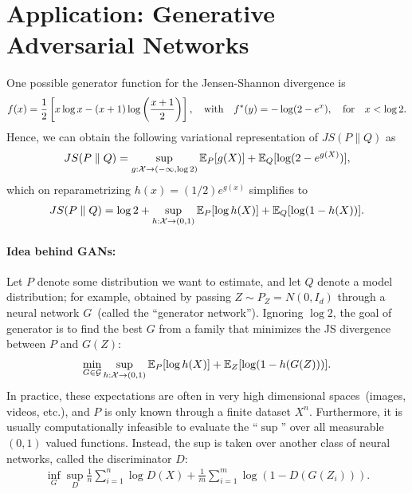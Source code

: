 \documentclass[12pt]{article}
\begin{document}
\section{Application: Generative Adversarial Networks}
\label{sec:applications}
One possible generator function for the Jensen-Shannon divergence is 
\begin{align}
f(x) = \frac{1}{2} \left[ x \log x - (x+1) \log \left( \frac{x+1}{2} \right) \right],  \quad \text{with} \quad 
f^*(y) = - \log(2-e^x), \quad \text{for} \quad x < \log 2. 
\end{align}
Hence, we can obtain the following variational representation of $JS(P \parallel Q)$ as 
\begin{align}
JS(P \parallel Q) = \sup_{g:{\cal X} \to (-\infty, \log 2)} \mathbb{E}_P[g(X)] + \mathbb{E}_Q[\log(2 - e^{g(X)})], 
\end{align}
which on reparametrizing $h(x) = (1/2)e^{g(x)}$ simplifies to 
\begin{align}
JS(P \parallel Q) = \log 2 + \sup_{h: {\cal X} \to (0, 1)} \mathbb{E}_P[\log h(X)] + \mathbb{E}_Q[\log(1-h(X))]. 
\end{align}

\paragraph{Idea behind GANs:} Let $P$ denote some distribution we want to estimate, and let $Q$ denote a model distribution; for example, obtained by passing $Z \sim P_Z = N(0, I_d)$ through a neural network $G$~(called the ``generator network''). Ignoring $\log2$, the goal of generator is to find the best $G$ from a family that minimizes the JS divergence between $P$ and $G(Z)$: 
\begin{align}
\min_{G \in {\cal G}} \sup_{h: {\cal X} \to (0,1)} \mathbb{E}_P[\log h(X)] + \mathbb{E}_Z[\log(1-h(G(Z)))]. 
\end{align}
In practice, these expectations are often in very high dimensional spaces~(images, videos, etc.), and  $P$ is only known through a finite dataset $X^n$. Furthermore, it is usually computationally infeasible to evaluate the ``$\sup$'' over all measurable $(0,1)$ valued functions. Instead, the sup is taken over another class of neural networks, called the discriminator $D$: 
\begin{align}
\inf_{G} \sup_{D} \frac{1}{n} \sum_{i=1}^n \log D(X) + \frac{1}{m} \sum_{i=1}^m \log (1 - D(G(Z_i))). 
\end{align}


\end{document}
